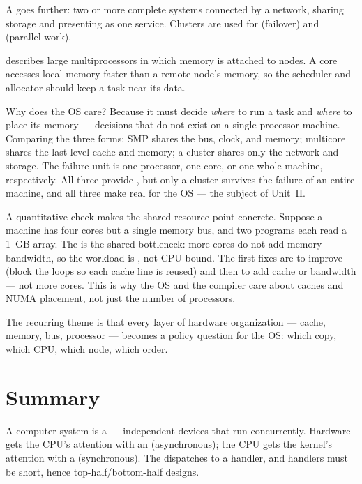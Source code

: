 \documentclass[11pt]{article}
\begin{document}
A  goes further: two or more complete systems connected by a network, sharing storage and presenting as one service. Clusters are used for  (failover) and  (parallel work).

 describes large multiprocessors in which memory is attached to nodes. A core accesses local memory faster than a remote node's memory, so the scheduler and allocator should keep a task near its data.

Why does the OS care? Because it must decide \emph{where} to run a task and \emph{where} to place its memory --- decisions that do not exist on a single-processor machine. Comparing the three forms: SMP shares the bus, clock, and memory; multicore shares the last-level cache and memory; a cluster shares only the network and storage. The failure unit is one processor, one core, or one whole machine, respectively. All three provide , but only a cluster survives the failure of an entire machine, and all three make  real for the OS --- the subject of Unit~II.

A quantitative check makes the shared-resource point concrete. Suppose a machine has four cores but a single memory bus, and two programs each read a 1~GB array. The  is the shared bottleneck: more cores do not add memory bandwidth, so the workload is , not CPU-bound. The first fixes are to improve  (block the loops so each cache line is reused) and then to add cache or bandwidth --- not more cores. This is why the OS and the compiler care about caches and NUMA placement, not just the number of processors.

The recurring theme is that every layer of hardware organization --- cache, memory, bus, processor --- becomes a policy question for the OS: which copy, which CPU, which node, which order.

\section{Summary}

A computer system is a  --- independent devices that run concurrently. Hardware gets the CPU's attention with an  (asynchronous); the CPU gets the kernel's attention with a  (synchronous). The  dispatches to a handler, and handlers must be short, hence top-half/bottom-half designs.
\end{document}
